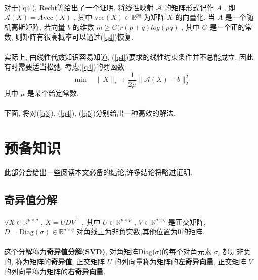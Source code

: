 \documentclass[a4paper, UTF8]{ctexart}
\numberwithin{equation}{section}  %
\begin{document}
			\paragraph{}
				\quad 对于(\ref{q4}), Recht等给出了一个证明. 将线性映射 $\mathcal{A}$ 的矩阵形式记作 $A$ , 即 $\mathcal{A}(X) = A\text{vec}(X)$ , 其中 $\text{vec}(X) \in \mathbb{R}^{pq}$ 为矩阵 $X$ 的向量化. 当 $A$ 是一个随机高斯矩阵, 若向量 $b$ 的维数 $m \ge C(r(p + q)log(pq)$ , 其中 $C$ 是一个正的常数, 则矩阵有很高概率可以通过(\ref{q4})恢复.

			\paragraph{}
				\quad 实际上, 由线性代数知识容易知道, (\ref{q4})要求的线性约束条件并不总能成立, 因此有时需要适当松弛. 考虑(\ref{q4})的罚函数:
				\begin{equation}\label{q5}
					\min \quad \lVert{X}\rVert_*+ \frac{1}{2\mu} \lVert{\mathcal{A}(X) - b}\rVert_2^2
				\end{equation}
				其中 $\mu$ 是某个给定常数.

			\paragraph{}
				\quad 下面, 将对(\ref{q3}), (\ref{q4}), (\ref{q5})分别给出一种高效的解法.

	\section{预备知识}
		此部分会给出一些阅读本文必备的结论,许多结论将略过证明.
		\subsection{奇异值分解}
			\paragraph{}
				\quad $\forall X \in \mathbb{R}^{p \times q}$ , $X = U D V^\top$ , 其中 $U \in \mathbb{R}^{p \times p}$ , $V \in \mathbb{R}^{q \times q}$ 是正交矩阵, $ D = \text{Diag}(\sigma) \in \mathbb{R}^{p \times q}$ 对角线上为非负实数,其他位置为0的矩阵.

			\paragraph{}
				\quad 这个分解称为\textbf{奇异值分解(SVD)}, 对角矩阵Diag($\sigma$)的每个对角元素 $\sigma_i$ 都是非负的, 称为矩阵的\textbf{奇异值}, 正交矩阵 $U$ 的列向量称为矩阵的\textbf{左奇异向量}, 正交矩阵 $V$ 的列向量称为矩阵的\textbf{右奇异向量}.
\end{document}
